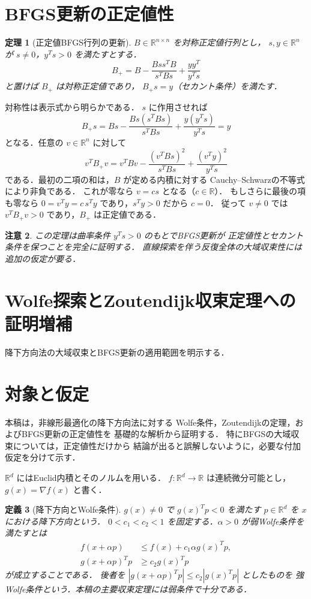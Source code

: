 \documentclass[a5paper,10pt,onecolumn]{jsarticle}
\makeatletter
\theoremstyle{mathnotetheorem}
\newtheorem{theorem}{定理}[section]
\newtheorem{definition}[theorem]{定義}
\newtheorem{remark}[theorem]{注意}
\renewcommand{\proofname}{証明}
\renewenvironment{proof}[1][\proofname]{%
  \par\pushQED{\qed}\normalfont\topsep4\p@\@plus2\p@\relax
  \trivlist\item[\hskip\labelsep\bfseries #1]\ignorespaces
}{\popQED\endtrivlist\@endpefalse}
\makeatother
\begin{document}
\section{BFGS更新の正定値性}
\begin{theorem}[正定値BFGS行列の更新]
$B\in\mathbb R^{n\times n}$ を対称正定値行列とし，
$s,y\in\mathbb R^n$ が $s\ne0$，$y^Ts>0$ を満たすとする．
\[
 B_+=B-\frac{Bss^TB}{s^TBs}+\frac{yy^T}{y^Ts}
\]
と置けば $B_+$ は対称正定値であり，
$B_+s=y$（セカント条件）を満たす．
\end{theorem}
\begin{proof}
対称性は表示式から明らかである．
$s$ に作用させれば
\[
 B_+s=Bs-\frac{Bs(s^TBs)}{s^TBs}
              +\frac{y(y^Ts)}{y^Ts}=y
\]
となる．任意の $v\in\mathbb R^n$ に対して
\[
 v^TB_+v=v^TBv-\frac{(v^TBs)^2}{s^TBs}
                      +\frac{(v^Ty)^2}{y^Ts}
\]
である．最初の二項の和は，$B$ が定める内積に対する
Cauchy--Schwarzの不等式により非負である．
これが零なら $v=cs$ となる（$c\in\mathbb R$）．
もしさらに最後の項も零なら
$0=v^Ty=c\,s^Ty$ であり，$s^Ty>0$ だから $c=0$．
従って $v\ne0$ では $v^TB_+v>0$ であり，$B_+$ は正定値である．
\end{proof}
\begin{remark}
この定理は曲率条件 $y^Ts>0$ のもとでBFGS更新が
正定値性とセカント条件を保つことを完全に証明する．
直線探索を伴う反復全体の大域収束性には追加の仮定が要る．
\end{remark}

\section{Wolfe探索とZoutendijk収束定理への証明増補}
降下方向法の大域収束とBFGS更新の適用範囲を明示する．

\section{対象と仮定}
本稿は，非線形最適化の降下方向法に対する
Wolfe条件，Zoutendijkの定理，およびBFGS更新の正定値性を
基礎的な解析から証明する．
特にBFGSの大域収束については，正定値性だけから
結論が出ると誤解しないように，必要な付加仮定を分けて示す．

$\mathbb R^d$ にはEuclid内積とそのノルムを用いる．
$f:\mathbb R^d\to\mathbb R$ は連続微分可能とし，
$g(x)=\nabla f(x)$ と書く．

\begin{definition}[降下方向とWolfe条件]
$g(x)\ne0$ で $g(x)^Tp<0$ を満たす $p\in\mathbb R^d$ を
$x$ における\emph{降下方向}という．
$0<c_1<c_2<1$ を固定する．$\alpha>0$ が弱Wolfe条件を満たすとは
\begin{align}
 f(x+\alpha p)&\le f(x)+c_1\alpha g(x)^Tp,\label{eq:armijo}\\
 g(x+\alpha p)^Tp&\ge c_2 g(x)^Tp\label{eq:curv}
\end{align}
が成立することである．
後者を $|g(x+\alpha p)^Tp|\le c_2|g(x)^Tp|$ としたものを
強Wolfe条件という．本稿の主要収束定理には弱条件で十分である．
\end{definition}
\end{document}
